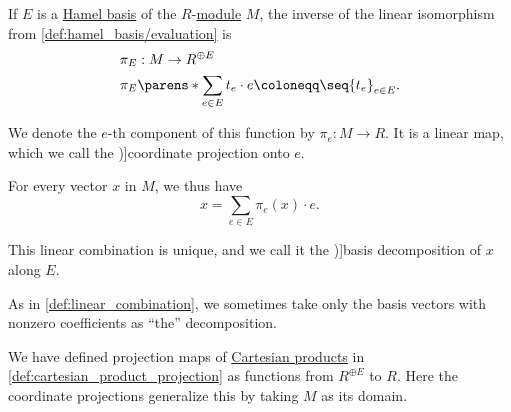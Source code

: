 \begin{definition}\label{def:basis_decomposition}\mimprovised
  If \( E \) is a \hyperref[def:hamel_basis]{Hamel basis} of the \( R \)-\hyperref[def:module]{module} \( M \), the inverse of the linear isomorphism from \cref{def:hamel_basis/evaluation} is
  \begin{equation*}
    \begin{aligned}
      &\pi_E: M \to R^{\oplus E} \\
      &\pi_E\parens*{ \sum_{e \in E} t_e \cdot e } \coloneqq \seq{ t_e }_{e \in E}.
    \end{aligned}
  \end{equation*}

  We denote the \( e \)-th component of this function by \( \pi_e: M \to R \). It is a linear map, which we call the \term[en=coordinate projection (\cite[\S 1.34]{Schechter1997AnalysisHandbook})]{coordinate projection} onto \( e \).

  For every vector \( x \) in \( M \), we thus have
  \begin{equation*}
    x = \sum_{e \in E} \pi_e(x) \cdot e.
  \end{equation*}

  This linear combination is unique, and we call it the \term[ru=разложение по базису (\cite[sec. 12.1]{Тыртышников2007ЛинейнаяАлгебра})]{basis decomposition} of \( x \) along \( E \).
\end{definition}
\begin{comments}
  \item As in \cref{def:linear_combination}, we sometimes take only the basis vectors with nonzero coefficients as \enquote{the} decomposition.

  \item We have defined projection maps of \hyperref[def:cartesian_product]{Cartesian products} in \cref{def:cartesian_product_projection} as functions from \( R^{\oplus E} \) to \( R \). Here the coordinate projections generalize this by taking \( M \) as its domain.
\end{comments}

